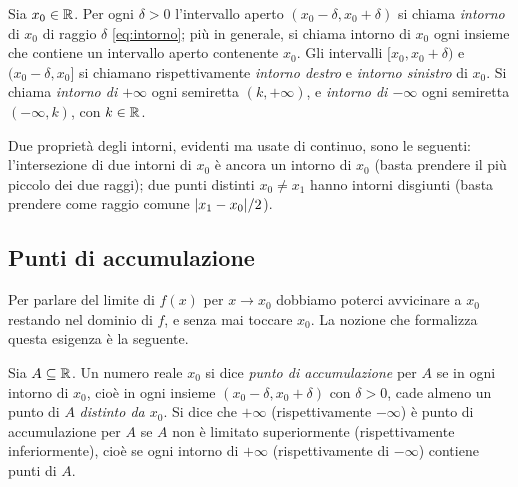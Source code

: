 \begin{definizione}[Intorni]\label{def:intorni}
Sia $x_{0}\in\mathbb{R}$. Per ogni $\delta>0$ l'intervallo aperto $(x_{0}-\delta,x_{0}+\delta)$
si chiama \emph{intorno} di $x_{0}$ di raggio $\delta$ \eqref{eq:intorno}; più in
generale, si chiama intorno di $x_{0}$ ogni insieme che contiene un intervallo aperto
contenente $x_{0}$. Gli intervalli $[x_{0},x_{0}+\delta)$ e $(x_{0}-\delta,x_{0}]$ si
chiamano rispettivamente \emph{intorno destro} e \emph{intorno sinistro} di $x_{0}$.
Si chiama \emph{intorno di $+\infty$} ogni semiretta $(k,+\infty)$, e \emph{intorno di
$-\infty$} ogni semiretta $(-\infty,k)$, con $k\in\mathbb{R}$.
\end{definizione}

Due proprietà degli intorni, evidenti ma usate di continuo, sono le seguenti:
l'intersezione di due intorni di $x_{0}$ è ancora un intorno di $x_{0}$ (basta prendere
il più piccolo dei due raggi); due punti distinti $x_{0}\neq x_{1}$ hanno intorni
disgiunti (basta prendere come raggio comune $\lvert x_{1}-x_{0}\rvert/2$).

\subsection{Punti di accumulazione}

Per parlare del limite di $f(x)$ per $x\to x_{0}$ dobbiamo poterci avvicinare a $x_{0}$
restando nel dominio di $f$, e senza mai toccare $x_{0}$. La nozione che formalizza
questa esigenza è la seguente.

\begin{definizione}\label{def:punto-accumulazione}
Sia $A\subseteq\mathbb{R}$. Un numero reale $x_{0}$ si dice \emph{punto di accumulazione} per
$A$ se in ogni intorno di $x_{0}$, cioè in ogni insieme $(x_{0}-\delta,x_{0}+\delta)$ con
$\delta>0$, cade almeno un punto di $A$ \emph{distinto da $x_{0}$}. Si dice che $+\infty$
(rispettivamente $-\infty$) è punto di accumulazione per $A$ se $A$ non è limitato
superiormente (rispettivamente inferiormente), cioè se ogni intorno di $+\infty$
(rispettivamente di $-\infty$) contiene punti di $A$.
\end{definizione}

\begin{marginfigure}
\centering
{}
\caption{L'insieme $\{1/n : n\in\N\}$: i suoi punti si addensano verso $0$, che è
l'unico punto di accumulazione e non appartiene all'insieme; ogni punto $1/n$ è invece
isolato.}
\label{fig:accumulazione}
\end{marginfigure}


